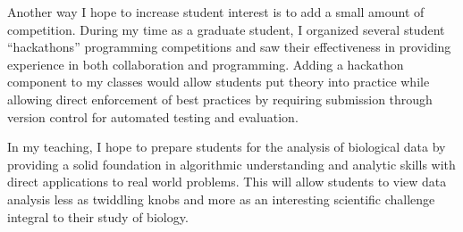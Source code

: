 \documentclass[12pt]{article}
\begin{document}
  Another way I hope to increase student interest is to add a small amount of competition. During my time as a graduate student, I organized several student ``hackathons'' programming competitions and saw their effectiveness in providing experience in both collaboration and programming. Adding a hackathon component to my classes would allow students put theory into practice while allowing direct enforcement of best practices by requiring submission through version control for automated testing and evaluation. 
 
In my teaching, I hope to prepare students for the analysis of biological data by providing a solid foundation in algorithmic understanding and analytic skills with direct applications to real world problems. This will allow students to view data analysis less as twiddling knobs and more as an interesting scientific challenge integral to their study of biology.

 
\end{document}
